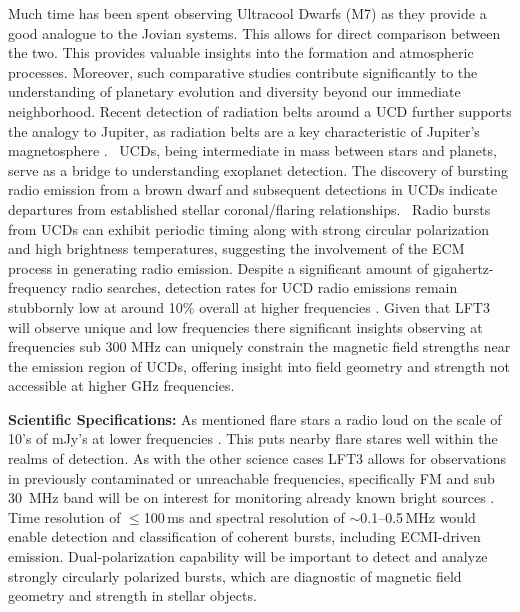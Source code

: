 Much time has been spent observing Ultracool Dwarfs (M7) as they provide a good analogue to the Jovian systems. This allows for direct comparison between the two.  This provides valuable insights into the formation and atmospheric processes. Moreover, such comparative studies contribute significantly to the understanding of planetary evolution and diversity beyond our immediate neighborhood. Recent detection of radiation belts around a UCD further supports the analogy to Jupiter, as radiation belts are a key characteristic of Jupiter's magnetosphere \citep{joe_nature_review}. \ UCDs, being intermediate in mass between stars and planets, serve as a bridge to understanding exoplanet detection. The discovery of bursting radio emission from a brown dwarf and subsequent detections in UCDs indicate departures from established stellar coronal/flaring relationships. \ Radio bursts from UCDs can exhibit periodic timing \citep{hallinan_rotational_2006} along with strong circular polarization and high brightness temperatures, suggesting the involvement of the ECM process in generating radio emission. Despite a significant amount of gigahertz-frequency radio searches, detection rates for UCD radio emissions remain stubbornly low at around 10\% overall at higher frequencies \citep{lynch_radio_2016}. Given that LFT3 will observe unique and low frequencies there significant insights observing at frequencies sub 300 MHz can uniquely constrain the magnetic field strengths near the emission region of UCDs, offering insight into field geometry and strength not accessible at higher GHz frequencies. 



\textbf{Scientific Specifications:} As mentioned flare stars a radio loud on the scale of 10's of mJy's at lower frequencies \citep{driessen_sydney_2024}. This puts nearby flare stares well within the realms of detection. As with the other science cases LFT3 allows for observations in previously contaminated or unreachable frequencies, specifically FM and sub 30~MHz band will be on interest for monitoring already known bright sources \citep{joe_nature_review}. Time resolution of $\leq$100\,ms and spectral resolution of $\sim$0.1--0.5\,MHz would enable detection and classification of coherent bursts, including ECMI-driven emission. Dual-polarization capability will be important to detect and analyze strongly circularly polarized bursts, which are diagnostic of magnetic field geometry and strength in stellar objects. 


